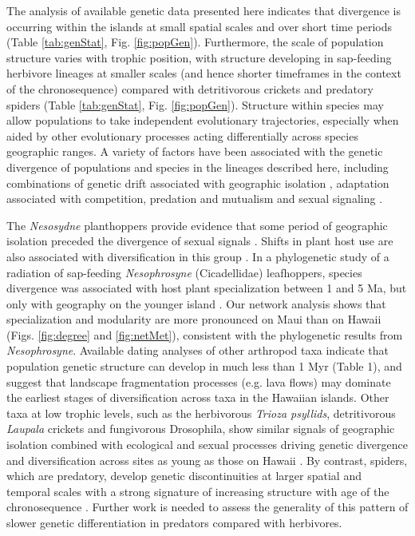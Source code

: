 The analysis of available genetic data presented here indicates that
divergence is occurring within the islands at small spatial scales and
over short time periods (Table \ref{tab:genStat},
Fig. \ref{fig:popGen}). Furthermore, the scale of population structure
varies with trophic position, with structure developing in sap-feeding
herbivore lineages at smaller scales (and hence shorter timeframes in
the context of the chronosequence) compared with detritivorous
crickets and predatory spiders (Table \ref{tab:genStat},
Fig. \ref{fig:popGen}). Structure within species may allow populations
to take independent evolutionary trajectories, especially when aided
by other evolutionary processes acting differentially across species
geographic ranges. A variety of factors have been associated with the
genetic divergence of populations and species in the lineages
described here, including combinations of genetic drift associated
with geographic isolation \citep{percy2003, mendelson2005, ogrady2011,
  goodman2012}, adaptation associated with competition, predation and
mutualism \citep{gillespie2004, roderick2008, brewer2015} and sexual
signaling \citep{mendelson2005, percy2006, magnacca2008, goodman2015}.

The \textit{Nesosydne} planthoppers provide evidence that some period
of geographic isolation preceded the divergence of sexual signals
\citep{goodman2012, goodman2015}. Shifts in plant host use are also
associated with diversification in this group \citep{roderick2008}. In
a phylogenetic study of a radiation of sap-feeding
\textit{Nesophrosyne} (Cicadellidae) leafhoppers, species divergence
was associated with host plant specialization between 1 and 5 Ma, but
only with geography on the younger island \citep{bennett2013}. Our
network analysis shows that specialization and modularity are more
pronounced on Maui than on Hawaii (Figs. \ref{fig:degree} and
\ref{fig:netMet}), consistent with the phylogenetic results from
\textit{Nesophrosyne}. Available dating analyses of other arthropod
taxa indicate that population genetic structure can develop in much
less than 1 Myr (Table 1), and suggest that landscape fragmentation
processes (e.g. lava flows) may dominate the earliest stages of
diversification across taxa in the Hawaiian islands. Other taxa at low
trophic levels, such as the herbivorous \textit{Trioza psyllids},
detritivorous \textit{Laupala} crickets and fungivorous Drosophila,
show similar signals of geographic isolation combined with ecological
and sexual processes driving genetic divergence and diversification
across sites as young as those on Hawaii \citep{percy2003,
  mendelson2005, percy2006, magnacca2008, ogrady2011}. By contrast,
spiders, which are predatory, develop genetic discontinuities at
larger spatial and temporal scales with a strong signature of
increasing structure with age of the chronosequence \citep[][Table
1]{roderick2012}. Further work is needed to assess the generality of
this pattern of slower genetic differentiation in predators compared
with herbivores.


